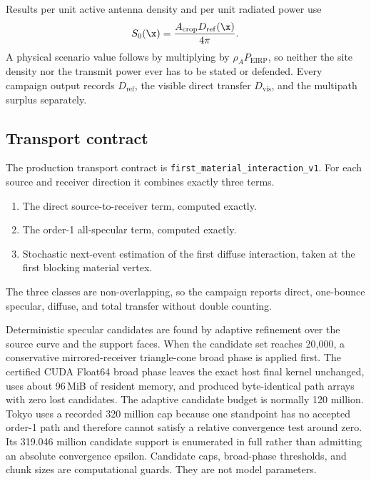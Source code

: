 Results per unit active antenna density and per unit radiated power use
\begin{equation}
  S_0(\x) = \frac{A_{\mathrm{crop}} D_{\mathrm{ref}}(\x)}{4\pi} .
  \label{eq:s0}
\end{equation}
A physical scenario value follows by multiplying by
$\rho_A P_{\mathrm{EIRP}}$, so neither the site density nor the transmit power
ever has to be stated or defended. Every campaign output records
$D_{\mathrm{ref}}$, the visible direct transfer $D_{\mathrm{vis}}$, and the
multipath surplus separately.

\subsection{Transport contract}
\label{sec:transport}

The production transport contract is
\texttt{first\_material\_interaction\_v1}. For each source and receiver
direction it combines exactly three terms.

\begin{enumerate}
  \item[T1] The direct source-to-receiver term, computed exactly.
  \item[T2] The order-1 all-specular term, computed exactly.
  \item[T3] Stochastic next-event estimation of the first diffuse interaction,
  taken at the first blocking material vertex.
\end{enumerate}

The three classes are non-overlapping, so the campaign reports direct,
one-bounce specular, diffuse, and total transfer without double counting.

Deterministic specular candidates are found by adaptive refinement over the
source curve and the support faces. When the candidate set reaches 20,000, a
conservative mirrored-receiver triangle-cone broad phase is applied first. The
certified CUDA Float64 broad phase leaves the exact host final kernel
unchanged, uses about 96\,MiB of resident memory, and produced byte-identical
path arrays with zero lost candidates. The adaptive candidate budget is
normally 120 million. Tokyo uses a recorded 320 million cap because one
standpoint has no accepted order-1 path and therefore cannot satisfy a relative
convergence test around zero. Its 319.046 million candidate support is
enumerated in full rather than admitting an absolute convergence epsilon.
Candidate caps, broad-phase thresholds, and chunk sizes are computational
guards. They are not model parameters.

